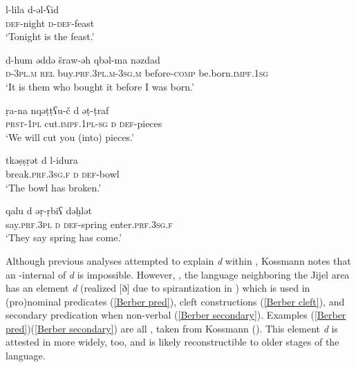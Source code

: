 \documentclass[output=paper]{langsci/langscibook}
\begin{document}
\begin{exe}
\ex\label{nonverbal}

\gll l-lila  d-ǝl-ʕid\\
     \textsc{def}-night  \textsc{d}-\textsc{def}-feast\\
\glt ‘Tonight is the feast.’
\ex\label{clefts}

\gll d-hum  ǝddǝ  šraw-ǝh   qbǝl-ma  nǝzdad\\
     \textsc{d}-\textsc{3pl.m} \textsc{rel}  buy.\textsc{prf.3pl.m}-\textsc{3sg.m}  before-\textsc{comp} be.born.\textsc{impf.1sg}\\
\glt ‘It is them who bought it before I was born.’
\ex\label{secondary pred}

\gll ṛa-na  nqǝṭṭʕu-č  d  ǝṭ-ṭraf\\
     \textsc{prst}-\textsc{1pl}  cut.\textsc{impf.1pl-sg}  \textsc{d}  \textsc{def}-pieces\\
\glt ‘We will cut you (into) pieces.’
\ex\label{focus}

\gll tkǝṣṣṛǝt  d  l-idura\\
     break.\textsc{prf.3sg.f}  \textsc{d}  \textsc{def}-bowl\\
\glt ‘The bowl has broken.’
\ex\label{left focalizations}

\gll qalu  d  ǝṛ-ṛbiʕ  dǝḫlǝt\\
     say.\textsc{prf.3pl}  \textsc{d}  \textsc{def}-spring  enter.\textsc{prf.3sg.f}\\
\glt ‘They say spring has come.’
\end{exe}

Although previous analyses attempted to explain \textit{d} within , Kossmann notes that an -internal  of \textit{d} is impossible. However, , the  language neighboring the Jijel area has an element \textit{d} (realized [ð] due to spirantization in ) which is used in (pro)nominal predicates (\ref{Berber pred}), cleft constructions (\ref{Berber cleft}), and secondary predication when non-verbal (\ref{Berber secondary}). Examples (\ref{Berber pred})\textendash(\ref{Berber secondary}) are all  , taken from Kossmann (\citeyear[135]{Kossmann2014}). This element \textit{d} is attested in  more widely, too, and is likely reconstructible to older stages of the language.
\end{document}
